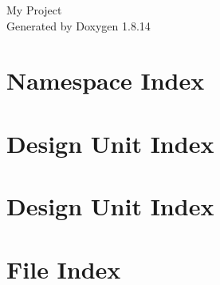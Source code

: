 \documentclass[twoside]{book}
\newcommand{\+}{\discretionary{\mbox{\scriptsize$\hookleftarrow$}}{}{}}
\newcommand{\clearemptydoublepage}{%
  \newpage{\pagestyle{empty}\cleardoublepage}%
}
\begin{document}
\hypersetup{pageanchor=false,
             bookmarksnumbered=true,
             pdfencoding=unicode
            }
\begin{titlepage}
\vspace*{7cm}
\begin{center}%
{\Large My Project }\\
\vspace*{1cm}
{\large Generated by Doxygen 1.8.14}\\
\end{center}
\end{titlepage}
\clearemptydoublepage
{}
\tableofcontents
\clearemptydoublepage
{}
\hypersetup{pageanchor=true}

\chapter{Namespace Index}

\chapter{Design Unit Index}

\chapter{Design Unit Index}

\chapter{File Index}

\end{document}
